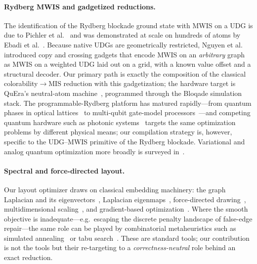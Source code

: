 \documentclass[11pt]{article}
\theoremstyle{definition}
\theoremstyle{remark}
\begin{document}
\paragraph{Rydberg MWIS and gadgetized reductions.} The identification of the
Rydberg blockade ground state with MWIS on a UDG is due to
Pichler et al.~\cite{Pichler2018} and was demonstrated at scale on hundreds of
atoms by Ebadi et al.~\cite{Ebadi2022}. Because native UDGs are geometrically
restricted, Nguyen et al.~\cite{Nguyen2023} introduced copy and crossing gadgets
that encode MWIS on an \emph{arbitrary} graph as MWIS on a weighted UDG laid out
on a grid, with a known value offset and a structural decoder. Our primary path
is exactly the composition of the classical colorability$\to$MIS reduction with
this gadgetization; the hardware target is QuEra's neutral-atom
machine~\cite{Wurtz2023}, programmed through the Bloqade simulation stack. The
programmable-Rydberg platform has matured rapidly---from quantum phases in optical
lattices~\cite{Ebadi2021} to multi-qubit gate-model
processors~\cite{Graham2022}---and competing quantum hardware such as photonic
systems~\cite{Madsen2023} targets the same optimization problems by different
physical means; our compilation strategy is, however, specific to the UDG--MWIS
primitive of the Rydberg blockade. Variational
and analog quantum optimization more broadly is surveyed
in~\cite{Cerezo2021,Preskill2018}.

\paragraph{Spectral and force-directed layout.} Our layout optimizer draws on
classical embedding machinery: the graph Laplacian and its
eigenvectors~\cite{Chung1997,Fiedler1973}, Laplacian
eigenmaps~\cite{Belkin2003}, force-directed drawing~\cite{Fruchterman1991},
multidimensional scaling~\cite{Kruskal1964}, and
gradient-based optimization~\cite{Nesterov2004,Boyd2004}. Where the smooth
objective is inadequate---e.g.\ escaping the discrete penalty landscape of
false-edge repair---the same role can be played by combinatorial metaheuristics
such as simulated annealing~\cite{Kirkpatrick1983} or tabu
search~\cite{Glover1997}. These are standard
tools; our contribution is not the tools but their re-targeting to a
\emph{correctness-neutral} role behind an exact reduction.
\end{document}
